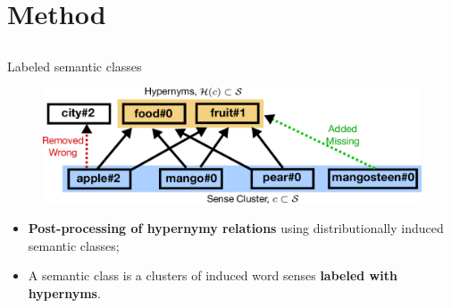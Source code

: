 \documentclass[usenames,dvipsnames]{beamer}
\begin{document}
\section{Method}
\subsection{}


\begin{frame}{ Labeled semantic classes}

\begin{figure}[ht]
  \centering
  \includegraphics[width=.99\textwidth]{figures/coset}

\end{figure}

\begin{itemize}
\item \textbf{\alert{Post-processing of hypernymy relations}} using distributionally induced semantic classes;
\item A semantic class is a clusters of induced word senses \textbf{\alert{labeled with hypernyms}}.

\end{itemize}



\end{frame}
\end{document}

